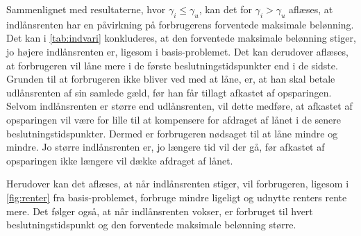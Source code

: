 Sammenlignet med resultaterne, hvor $\gamma_i \leq \gamma_u$, kan det for $\gamma_i > \gamma_u$ aflæses, at indlånsrenten har en påvirkning på forbrugerens forventede maksimale belønning. Det kan i \autoref{tab:indvari} konkluderes, at den forventede maksimale belønning stiger, jo højere indlånsrenten er, ligesom i basis-problemet. Det kan derudover aflæses, at forbrugeren vil låne mere i de første beslutningstidspunkter end i de sidste. 
Grunden til at forbrugeren ikke bliver ved med at låne, er, at han skal betale udlånsrenten af sin samlede gæld, før han får tillagt afkastet af opsparingen. Selvom indlånsrenten er større end udlånsrenten, vil dette medføre, at afkastet af opsparingen vil være for lille til at kompensere for afdraget af lånet i de senere beslutningstidspunkter. Dermed er forbrugeren nødsaget til at låne mindre og mindre. Jo større indlånsrenten er, jo længere tid vil der gå, før afkastet af opsparingen ikke længere vil dække afdraget af lånet. 

Herudover kan det aflæses, at når indlånsrenten stiger, vil forbrugeren, ligesom i \autoref{fig:renter} fra basis-problemet, forbruge mindre ligeligt og udnytte renters rente mere. Det følger også, at når indlånsrenten vokser, er forbruget til hvert beslutningstidspunkt og den forventede maksimale belønning større. 



